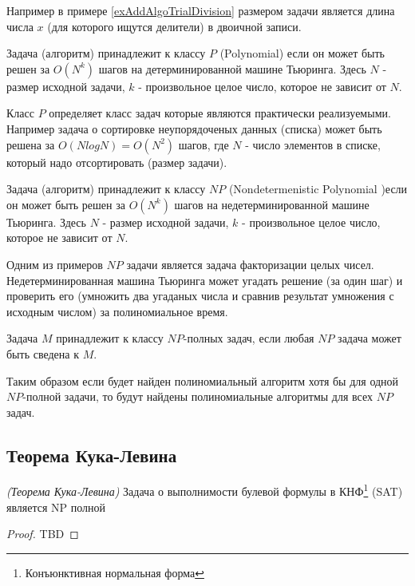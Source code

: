 Например в примере \ref{exAddAlgoTrialDivision} размером задачи
является длина числа $x$ (для которого ищутся делители) в двоичной
записи. 

\begin{definition}[Класс $P$]
Задача (алгоритм) принадлежит к классу $P$ (Polynomial) если он может
быть решен за 
 $O\left(N^k\right)$ шагов на детерминированной машине Тьюринга.
Здесь $N$ - размер исходной задачи, $k$ - произвольное целое число,
которое не зависит от $N$.  
\end{definition}

Класс $P$ определяет класс задач которые являются практически
реализуемыми. Например задача о сортировке неупорядоченых данных
(списка) может быть решена за 
$O\left(N log N \right) = O\left(N^2\right)$ шагов, где $N$ - число
элементов в списке, который надо отсортировать (размер задачи).

\begin{definition}[Класс $NP$]
Задача (алгоритм) принадлежит к классу $NP$ (Nondetermenistic Polynomial )если
он может быть решен за  $O\left(N^k\right)$ шагов на
недетерминированной машине Тьюринга.  Здесь $N$ - размер исходной
задачи, $k$ - произвольное целое число, которое не зависит от $N$. 
\end{definition}

Одним из примеров $NP$ задачи является задача факторизации целых
чисел. Недетерминированная машина Тьюринга может угадать решение (за
один шаг) и проверить его (умножить два угаданых числа и сравнив
результат умножения с исходным числом) за полиномиальное время.

\begin{definition}
Задача $M$ принадлежит к классу $NP$-полных задач, если любая $NP$ задача
может быть сведена к $M$.
\end{definition}

Таким образом если будет найден полиномиальный алгоритм хотя бы для
одной $NP$-полной задачи, то будут найдены полиномиальные алгоритмы
для всех $NP$ задач.

\subsection{Теорема Кука-Левина}

\begin{theorem}
\emph{(Теорема Кука-Левина)}
Задача о выполнимости булевой формулы в КНФ\footnote{Конъюнктивная нормальная форма} (SAT) является NP полной
\label{theoremAddAlgoCookTheorem}
\end{theorem}

\begin{proof}
TBD
\end{proof}
